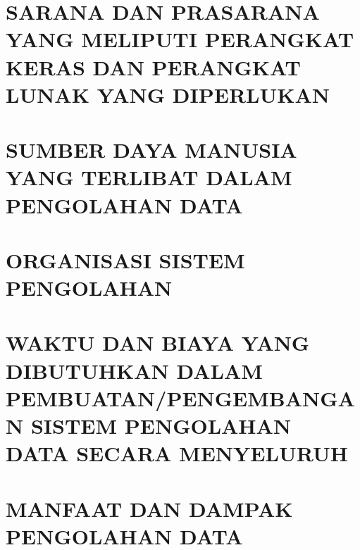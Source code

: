 \documentclass[pdftex,12pt, oneside]{article}
\begin{document}
\section{SARANA DAN PRASARANA YANG MELIPUTI PERANGKAT KERAS DAN PERANGKAT LUNAK YANG DIPERLUKAN}


\section{SUMBER DAYA MANUSIA YANG TERLIBAT DALAM PENGOLAHAN DATA}


\section{ORGANISASI SISTEM PENGOLAHAN}


\section{WAKTU DAN BIAYA YANG DIBUTUHKAN DALAM PEMBUATAN/PENGEMBANGAN SISTEM PENGOLAHAN DATA SECARA MENYELURUH}


\section{MANFAAT DAN DAMPAK PENGOLAHAN DATA}
\end{document}
